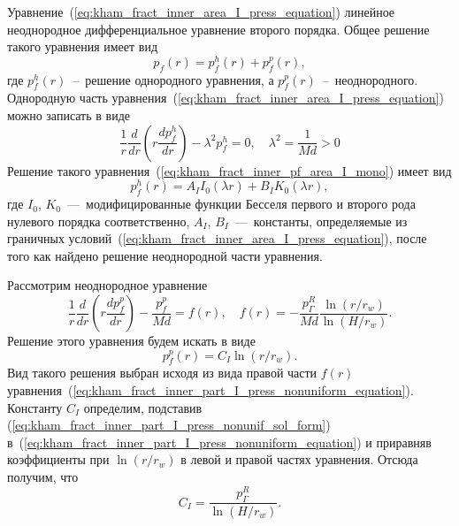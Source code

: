 \documentclass{article}
\begin{document}
Уравнение~(\ref{eq:kham_fract_inner_area_I_press_equation}) линейное неоднородное дифференциальное уравнение второго порядка.
Общее решение такого уравнения имеет вид
\begin{equation}
	\displaystyle
	p_f(r) = p_f^h\left(r\right) + p_f^p\left(r\right),
	\label{eq:kham_common_final_pf_ode_solution_view}
\end{equation}
где $p_f^h\left(r\right)$~--~решение однородного уравнения, а $p_f^p\left(r\right)$~--~неоднородного.
Однородную часть уравнения~(\ref{eq:kham_fract_inner_area_I_press_equation}) можно записать в виде
\begin{equation}
	\displaystyle
	\dfrac{1}{r}\dfrac{d}{dr}\left(r\dfrac{d p_f^h}{dr}\right) - \lambda^2 p_f^h = 0, \quad \lambda^2 = \dfrac{1}{Md} > 0
	\label{eq:kham_fract_inner_pf_area_I_mono}
\end{equation}
Решение такого уравнения~(\ref{eq:kham_fract_inner_pf_area_I_mono}) имеет вид
\begin{equation}
	\displaystyle
	p_f^h\left(r\right) = A_I I_0\left(\lambda r\right) + B_I K_0\left(\lambda r\right),
	\label{eq:kham_common_fa2_press_uniform_solution_main}
\end{equation}
где $I_0$, $K_0$~---~модифицированные функции Бесселя первого и второго рода нулевого порядка соответственно,
$A_I$, $B_I$~---~константы, определяемые из граничных условий~(\ref{eq:kham_fract_inner_area_I_press_equation}),
после того как найдено решение неоднородной части уравнения.

Рассмотрим неоднородное уравнение
\begin{equation}
	\displaystyle
	\dfrac{1}{r}\dfrac{d}{dr}\left(r\dfrac{d p_f^p}{dr}\right) - \dfrac{p_f^p}{Md} = f\left(r\right), \quad
	f\left(r\right) = - \dfrac{p^R_{\Gamma}}{Md} \dfrac{\ln{\left(r/r_w\right)}}{\ln{\left(H/r_w\right)}}.
	\label{eq:kham_fract_inner_part_I_press_nonuniform_equation}
\end{equation}
Решение этого уравнения будем искать в виде
\begin{equation}
	\displaystyle
	p_f^p\left(r\right) = C_I \ln\left(r/r_w\right).
	\label{eq:kham_fract_inner_part_I_press_nonunif_sol_form}
\end{equation}
Вид такого решения выбран исходя из вида правой части $f\left(r\right)$ уравнения~(\ref{eq:kham_fract_inner_part_I_press_nonuniform_equation}).
Константу $C_I$ определим, подставив (\ref{eq:kham_fract_inner_part_I_press_nonunif_sol_form}) в~(\ref{eq:kham_fract_inner_part_I_press_nonuniform_equation})
и приравняв коэффициенты при $\ln\left(r/r_w\right)$ в левой и правой частях уравнения. Отсюда получим, что
\begin{equation}
	\displaystyle
	C_I = \dfrac{p^R_{\Gamma}}{\ln{\left(H/r_w\right)}}.
	\label{eq:kham_fract_inner_part_I_sol_nonunif_c_cf}
\end{equation}
\end{document}
